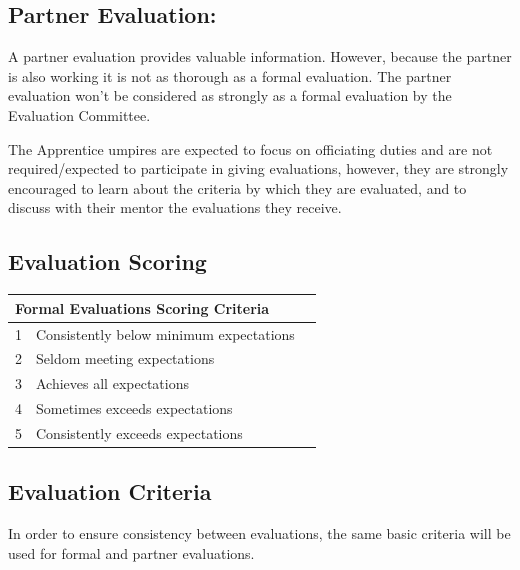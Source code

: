 \documentclass[letterpaper,11pt,colorlinks=true,allcolors=blue]{article}
\begin{document}
\subsection*{Partner Evaluation:}
A partner evaluation provides valuable information.  However, because the partner is also working it is not as thorough as a formal evaluation.  The partner evaluation won't be considered as strongly as a formal evaluation by the Evaluation Committee.  

The Apprentice umpires are expected to focus on officiating duties and are not required/expected to participate in giving evaluations, however, they are strongly encouraged to learn about the criteria by which they are evaluated, and to discuss with their mentor the evaluations they receive.

\subsection*{Evaluation Scoring}

\begin{tabular}{c l l}
\hline\hline
\multicolumn{2}{l}{\textbf{Formal Evaluations Scoring Criteria}} \\
\hline
1 & Consistently below minimum expectations \\
2 & Seldom meeting expectations \\ 
3 & Achieves all expectations \\
4 & Sometimes exceeds expectations \\
5 & Consistently exceeds expectations \\
\hline\hline
\end{tabular}

\subsection*{Evaluation Criteria}

In order to ensure consistency between evaluations, the same basic criteria will be used for formal and partner evaluations.
\end{document}
